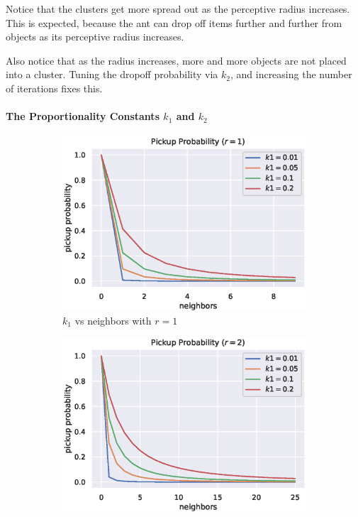 \documentclass[12pt]{article}
\begin{document}
Notice that the clusters get more spread out as the perceptive radius increases.
This is expected, because the ant can drop off items further and further from objects as its perceptive radius increases.

Also notice that as the radius increases, more and more objects are not placed into a cluster. Tuning the dropoff probability via $k_2$, and increasing the number of iterations fixes this.

\paragraph{The Proportionality Constants $k_1$ and $k_2$}

\begin{figure}[H]
    \begin{subfigure}[t]{0.32\textwidth}
        \centering
        \includegraphics[width=\textwidth]{figures/aca/k1-r1.eps}
        \caption{$k_1$ vs neighbors with $r=1$}
    \end{subfigure}%
    \begin{subfigure}[t]{0.32\textwidth}
        \centering
        \includegraphics[width=\textwidth]{figures/aca/k1-r2.eps}

\end{subfigure}
\end{figure}
\end{document}
